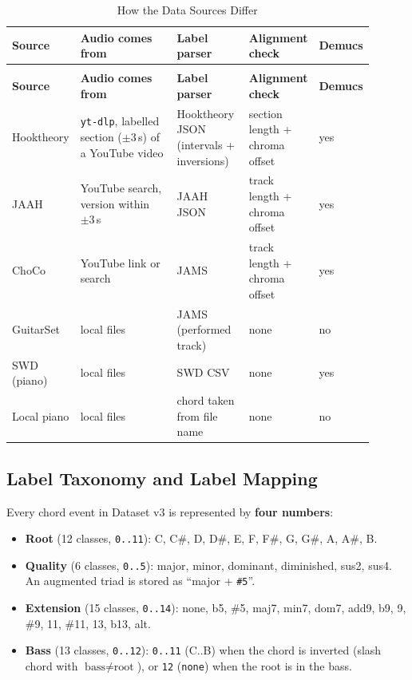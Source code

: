 \documentclass[a4paper]{article}
\begin{document}
\begin{longtable}{@{}
    >{\raggedright\arraybackslash}p{0.16\linewidth}
    >{\raggedright\arraybackslash}p{0.28\linewidth}
    >{\raggedright\arraybackslash}p{0.20\linewidth}
    >{\raggedright\arraybackslash}p{0.16\linewidth}
    >{\raggedright\arraybackslash}p{0.10\linewidth}@{}}

    \caption{How the Data Sources Differ}\label{tab:sources_compare} \\
    \toprule
    \textbf{Source} & \textbf{Audio comes from} & \textbf{Label parser} & \textbf{Alignment check} & \textbf{Demucs} \\
    \midrule
    \endfirsthead
    \multicolumn{5}{l}{\footnotesize\itshape (Table~\ref{tab:sources_compare} continued)}\\
    \toprule
    \textbf{Source} & \textbf{Audio comes from} & \textbf{Label parser} & \textbf{Alignment check} & \textbf{Demucs} \\
    \midrule
    \endhead
    \bottomrule
    \endlastfoot

    Hooktheory & \texttt{yt-dlp}, labelled section ($\pm 3$\,s) of a YouTube video & Hooktheory JSON (intervals + inversions) & section length + chroma offset & yes \\
    \addlinespace
    JAAH & YouTube search, version within $\pm 3$\,s & JAAH JSON & track length + chroma offset & yes \\
    \addlinespace
    ChoCo & YouTube link or search & JAMS & track length + chroma offset & yes \\
    \addlinespace
    GuitarSet & local files & JAMS (performed track) & none & no \\
    \addlinespace
    SWD (piano) & local files & SWD CSV & none & yes \\
    \addlinespace
    Local piano & local files & chord taken from file name & none & no \\
\end{longtable}

\subsection{Label Taxonomy and Label Mapping}

Every chord event in Dataset v3 is represented by \textbf{four numbers}:

\begin{itemize}
    \item \textbf{Root} (12 classes, \texttt{0..11}): C, C\#, D, D\#, E, F, F\#, G, G\#, A, A\#, B.
    \item \textbf{Quality} (6 classes, \texttt{0..5}): major, minor, dominant, diminished, sus2, sus4. An augmented triad is stored as ``major + \texttt{\#5}''.
    \item \textbf{Extension} (15 classes, \texttt{0..14}): none, b5, \#5, maj7, min7, dom7, add9, b9, 9, \#9, 11, \#11, 13, b13, alt.
    \item \textbf{Bass} (13 classes, \texttt{0..12}): \texttt{0..11} (C..B) when the chord is inverted (slash chord with $\text{bass} \neq \text{root}$), or \texttt{12} (\texttt{none}) when the root is in the bass.
\end{itemize}
\end{document}

